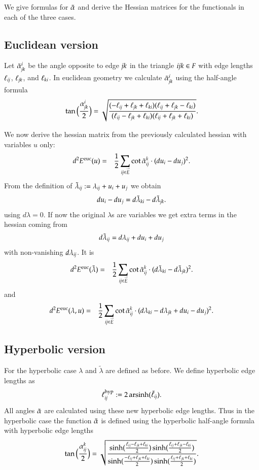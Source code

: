 \documentclass[Thesis]{subfiles}
\begin{document}
We give formulas for $\tilde{\alpha}$ and derive the Hessian matrices for the functionals in each of the three cases.

\subsection{Euclidean version}
\label{sec:euclidean_fuctional}

Let $\tilde{\alpha}^i_{\it jk}$ be the angle opposite to edge $\it jk$ in the triangle $\it ijk\in F$ with edge lengths $\ell_{\it ij}$, $\ell_{\it jk}$, and $\ell_{\it ki}$. In euclidean geometry we calculate $\tilde{\alpha}^i_{\it jk}$ using the half-angle formula
\[\tan\Big(\frac{ \alpha_{\it jk}^i}{2}\Big) = \sqrt{\frac
{(-\ell_{\it ij} +\ell_{\it jk} +\ell_{\it ki})(\ell_{\it ij} +\ell_{\it jk} -\ell_{\it ki})}
{(\ell_{\it ij} -\ell_{\it jk} +\ell_{\it ki})(\ell_{\it ij} + \ell_{\it jk} +\ell_{\it ki})}}.\]

We now derive the hessian matrix from the previously calculated hessian with variables $u$ only:
\begin{eqnarray}
d^2E^{\rm euc}(u)&=&\frac{1}{2}\sum_{\it ij \in \accentset{\rightharpoonup}{E}} \cot  \tilde{\alpha}_{\it ij}^k \cdot (du_i - du_j)^2.
\end{eqnarray}
From the definition of $\tilde\lambda_{\it ij} := \lambda_{\it ij}+u_i+u_j$ we obtain
\[du_i-du_j=d\tilde\lambda_{\it ki}-d\tilde\lambda_{\it jk}.\]
using $d\lambda = 0$. If now the original $\lambda$s are variables we get extra terms in the hessian coming from 
\[d\tilde\lambda_{\it ij}=d\lambda_{\it ij}+du_i+du_j\]
with non-vanishing $d\lambda_{\it ij}$. It is
\begin{eqnarray*}
d^2E^{\rm euc}(\tilde\lambda)
&=&\frac{1}{2}\sum_{\it ij \in \accentset{\rightharpoonup}{E}} \cot  \tilde{\alpha}_{\it ij}^k \cdot (d\tilde\lambda_{\it ki}-d\tilde\lambda_{\it jk})^2.
\end{eqnarray*}
and
\begin{eqnarray*}
d^2E^{\rm euc}(\lambda, u)&=&\frac{1}{2}\sum_{\it ij \in \accentset{\rightharpoonup}{E}} \cot  \tilde{\alpha}_{\it ij}^k \cdot (d\lambda_{\it ki}-d\lambda_{\it jk} + du_i - du_j)^2.
\end{eqnarray*}

\subsection{Hyperbolic version}
\label{sec:hyperbolic_fuctional}

For the hyperbolic case $\lambda$ and $\tilde\lambda$ are defined as before. We define hyperbolic edge lengths as 
\begin{equation}
\ell^{\rm hyp}_{\it ij} := 2\operatorname{arsinh}(\tilde \ell_{\it ij}).\label{eq:hyperbolic_lengths}
\end{equation}
All angles $\tilde{\alpha}$ are calculated using these new hyperbolic edge lengths.
Thus in the hyperbolic case the function $\tilde{\alpha}$ is defined using the hyperbolic half-angle formula with hyperbolic edge lengths
\[
  \tan\Big(\frac{\alpha^k_{\it ij}}{2}\Big)=
  \sqrt{\frac{
      \sinh(\frac{\ell_{ij}-\ell_{jk}+\ell_{ki}}{2})
      \sinh(\frac{\ell_{ij}+\ell_{jk}-\ell_{ki}}{2})
    }{
      \sinh(\frac{-\ell_{ij}+\ell_{jk}+\ell_{ki}}{2})
      \sinh(\frac{\ell_{ij}+\ell_{jk}+\ell_{ki}}{2})
    }}.
\]
\end{document}

